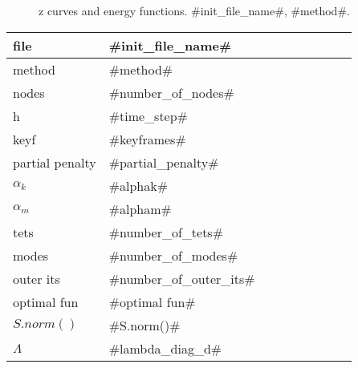 

\begin{figure}
  \centering
  \caption{z curves and energy functions. #init_file_name#, #method#.}
  \label{en_f}
\end{figure}

\begin{center}
  \begin{tabular}{|l*{8}{|l}}
    \hline
	file & #init_file_name# \\ \hline
	method & #method# \\ \hline
	nodes & #number_of_nodes# \\ \hline
	h & #time_step# \\ \hline
    keyf & #keyframes#\\\hline
    partial penalty & #partial_penalty#\\\hline
	$\alpha_k$ & #alphak# \\ \hline
	$\alpha_m$ & #alpham# \\ \hline
	tets & #number_of_tets# \\ \hline
	modes & #number_of_modes# \\ \hline
    outer its & #number_of_outer_its# \\ \hline
    optimal fun & #optimal fun# \\ \hline
	$S.norm()$ & #S.norm()# \\ \hline
	$\Lambda$ & #lambda_diag_d# 
  \end{tabular}
\end{center}